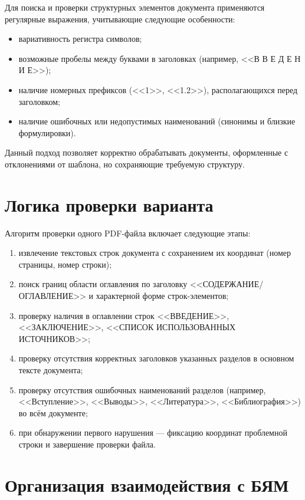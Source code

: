 Для поиска и проверки структурных элементов документа применяются
регулярные выражения, учитывающие следующие особенности:
\begin{itemize}
    \item вариативность регистра символов;
    \item возможные пробелы между буквами в заголовках
    (например, <<В В Е Д Е Н И Е>>);
    \item наличие номерных префиксов
    (<<1>>, <<1.2>>), располагающихся перед заголовком;
    \item наличие ошибочных или недопустимых наименований
    (синонимы и близкие формулировки).
\end{itemize}

Данный подход позволяет корректно обрабатывать документы, оформленные
с отклонениями от шаблона, но сохраняющие требуемую структуру.

\section{Логика проверки варианта}

Алгоритм проверки одного PDF-файла включает следующие этапы:
\begin{enumerate}
    \item извлечение текстовых строк документа с сохранением их координат
    (номер страницы, номер строки);
    \item поиск границ области оглавления по заголовку
    <<СОДЕРЖАНИЕ/ОГЛАВЛЕНИЕ>> и характерной форме строк-элементов;
    \item проверку наличия в оглавлении строк
    <<ВВЕДЕНИЕ>>, <<ЗАКЛЮЧЕНИЕ>>,
    <<СПИСОК ИСПОЛЬЗОВАННЫХ ИСТОЧНИКОВ>>;
    \item проверку отсутствия корректных заголовков указанных разделов
    в основном тексте документа;
    \item проверку отсутствия ошибочных наименований разделов
    (например, <<Вступление>>, <<Выводы>>, <<Литература>>, <<Библиография>>)
    во всём документе;
    \item при обнаружении первого нарушения — фиксацию координат
    проблемной строки и завершение проверки файла.
\end{enumerate}

\section{Организация взаимодействия с БЯМ}

